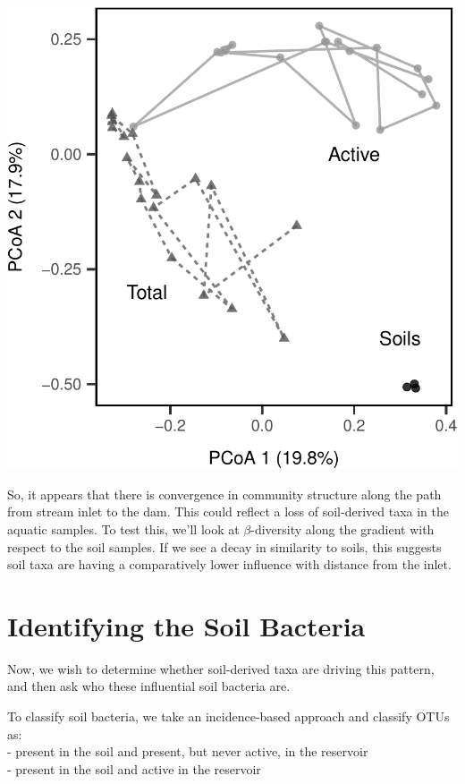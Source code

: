 \documentclass[]{article}
\begin{document}
\begin{center}\includegraphics{ReservoirGradient_files/figure-latex/ordination-1} \end{center}

So, it appears that there is convergence in community structure along
the path from stream inlet to the dam. This could reflect a loss of
soil-derived taxa in the aquatic samples. To test this, we'll look at
\(\beta\)-diversity along the gradient with respect to the soil samples.
If we see a decay in similarity to soils, this suggests soil taxa are
having a comparatively lower influence with distance from the inlet.

\section{Identifying the Soil
Bacteria}\label{identifying-the-soil-bacteria}

Now, we wish to determine whether soil-derived taxa are driving this
pattern, and then ask who these influential soil bacteria are.

To classify soil bacteria, we take an incidence-based approach and
classify OTUs as:\\
- present in the soil and present, but never active, in the reservoir\\
- present in the soil and active in the reservoir
\end{document}

